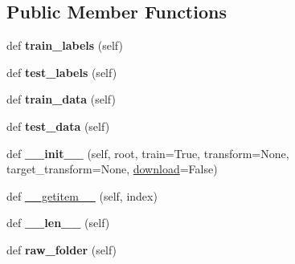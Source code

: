 \subsection*{Public Member Functions}
\begin{DoxyCompactItemize}
\item 
\mbox{\label{classtorchvision_1_1datasets_1_1mnist_1_1MNIST_a66d729e2faed4a3a999737f1a673fd05}} 
def {\bfseries train\+\_\+labels} (self)
\item 
\mbox{\label{classtorchvision_1_1datasets_1_1mnist_1_1MNIST_a8ece8300779109238f0963d7166c95c6}} 
def {\bfseries test\+\_\+labels} (self)
\item 
\mbox{\label{classtorchvision_1_1datasets_1_1mnist_1_1MNIST_aac5c76fcb436c878f6d761e8718d67d4}} 
def {\bfseries train\+\_\+data} (self)
\item 
\mbox{\label{classtorchvision_1_1datasets_1_1mnist_1_1MNIST_a4b2692832518bbfd666869eaa9454555}} 
def {\bfseries test\+\_\+data} (self)
\item 
\mbox{\label{classtorchvision_1_1datasets_1_1mnist_1_1MNIST_a939d9dc5746cc8e9630a0912e53f2136}} 
def {\bfseries \+\_\+\+\_\+init\+\_\+\+\_\+} (self, root, train=True, transform=None, target\+\_\+transform=None, \hyperlink{classtorchvision_1_1datasets_1_1mnist_1_1MNIST_aeb0f2b944361212497bd448ed09af5b6}{download}=False)
\item 
def \hyperlink{classtorchvision_1_1datasets_1_1mnist_1_1MNIST_a96cf0fdd925579d66776beb24e1723f0}{\+\_\+\+\_\+getitem\+\_\+\+\_\+} (self, index)
\item 
\mbox{\label{classtorchvision_1_1datasets_1_1mnist_1_1MNIST_a2206ade32e70e0d1a69c5db2e822b2c2}} 
def {\bfseries \+\_\+\+\_\+len\+\_\+\+\_\+} (self)
\item 
\mbox{\label{classtorchvision_1_1datasets_1_1mnist_1_1MNIST_a5e28a0038f525f84fad4e0cfe68d5f49}} 
def {\bfseries raw\+\_\+folder} (self)
\item 

\end{DoxyCompactItemize}
